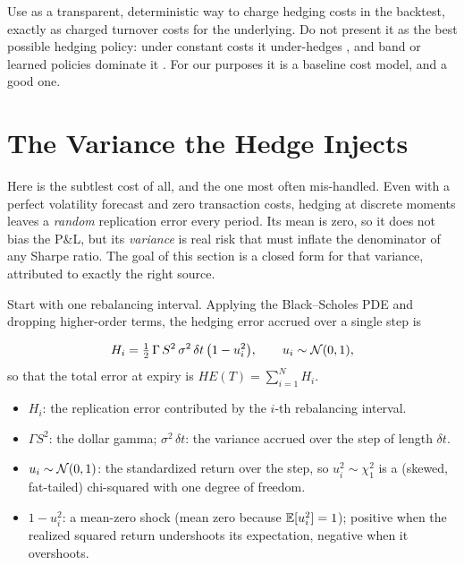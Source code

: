 \begin{warning}
Use  as a transparent, deterministic way to charge hedging costs in the backtest, exactly as  charged turnover costs for the underlying. Do not present it as the best possible hedging policy: under constant costs it under-hedges \citep{KabanovSafarian1997}, and band or learned policies dominate it \citep{ArzelLehdili2026, BrugiereTurinici2025}. For our purposes it is a baseline cost model, and a good one.
\end{warning}

\section{The Variance the Hedge Injects}
\label{sec:ivrv:hedging-error}

Here is the subtlest cost of all, and the one most often mis-handled. Even with a perfect volatility forecast and zero transaction costs, hedging at discrete moments leaves a \emph{random} replication error every period. Its mean is zero, so it does not bias the P\&L, but its \emph{variance} is real risk that must inflate the denominator of any Sharpe ratio. The goal of this section is a closed form for that variance, attributed to exactly the right source.

Start with one rebalancing interval. Applying the Black--Scholes PDE and dropping higher-order terms, the hedging error accrued over a single step is

\begin{equation}
\label{eq:ivrv:boyle-emanuel}
H_i = \tfrac{1}{2}\,\Gamma\, S^2\, \sigma^2\, \delta t \,\big(1 - u_i^2\big), \qquad u_i \sim \mathcal{N}(0,1),
\end{equation}
so that the total error at expiry is $HE(T) = \sum_{i=1}^{N} H_i$.

\begin{itemize}
  \item $H_i$: the replication error contributed by the $i$-th rebalancing interval.
  \item $\Gamma S^2$: the dollar gamma; $\sigma^2\,\delta t$: the variance accrued over the step of length $\delta t$.
  \item $u_i \sim \mathcal{N}(0,1)$: the standardized return over the step, so $u_i^2 \sim \chi^2_1$ is a (skewed, fat-tailed) chi-squared with one degree of freedom.
  \item $1 - u_i^2$: a mean-zero shock (mean zero because $\mathbb{E}[u_i^2] = 1$); positive when the realized squared return undershoots its expectation, negative when it overshoots.
\end{itemize}

